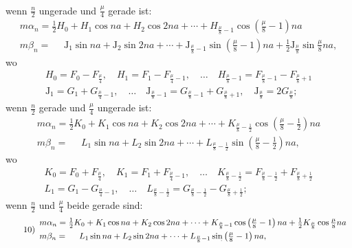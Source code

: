 \begin{landscape}
\[\begin{gathered}
\end{gathered}
\]
wenn \(\frac{n}{2}\) ungerade und \(\frac{\mu}{4}\) gerade ist:
\[
\tag*{8)}
\begin{array}{l}
m\alpha_n = \tfrac{1}{2}H_0 + H_1\cos na + H_2\cos 2na + \cdots + H_{\frac{\mu}{8}-1}\cos\left(\frac{\mu}{8}-1\right)na \\[4pt]
m\beta_n = \phantom{{}={}} \mathrm{J}_1\sin na + \mathrm{J}_2\sin 2na + \cdots + \mathrm{J}_{\frac{\mu}{8}-1}\sin\left(\frac{\mu}{8}-1\right)na + \tfrac{1}{2}\mathrm{J}_{\frac{\mu}{8}}\sin\frac{\mu}{8}na,
\end{array}
\]
wo
\[
\begin{gathered}
H_0 = F_0 - F_{\frac{\mu}{4}}, \quad H_1 = F_1 - F_{\frac{\mu}{4}-1}, \quad \ldots \quad H_{\frac{\mu}{8}-1} = F_{\frac{\mu}{8}-1} - F_{\frac{\mu}{8}+1}\\[4pt]
\mathrm{J}_1 = G_1 + G_{\frac{\mu}{4}-1}, \quad \ldots \quad \mathrm{J}_{\frac{\mu}{8}-1} = G_{\frac{\mu}{8}-1} + G_{\frac{\mu}{8}+1}, \quad \mathrm{J}_{\frac{\mu}{8}} = 2G_{\frac{\mu}{8}};
\end{gathered}
\]
wenn \(\frac{n}{2}\) gerade und \(\frac{\mu}{4}\) ungerade ist:
\[
\tag*{9)}
\begin{array}{l}
m\alpha_n = \tfrac{1}{2}K_0 + K_1\cos na + K_2\cos 2na + \cdots + K_{\frac{\mu}{8}-\frac{1}{2}}\cos\left(\frac{\mu}{8}-\frac{1}{2}\right)na \\[4pt]
m\beta_n = \phantom{{}={}} L_1\sin na + L_2\sin 2na + \cdots + L_{\frac{\mu}{8}-\frac{1}{2}}\sin\left(\frac{\mu}{8}-\frac{1}{2}\right)na,
\end{array}
\]
wo
\[
\begin{gathered}
K_0 = F_0 + F_{\frac{\mu}{4}}, \quad K_1 = F_1 + F_{\frac{\mu}{4}-1}, \quad \ldots \quad K_{\frac{\mu}{8}-\frac{1}{2}} = F_{\frac{\mu}{8}-\frac{1}{2}} + F_{\frac{\mu}{8}+\frac{1}{2}}\\[4pt]
L_1 = G_1 - G_{\frac{\mu}{4}-1}, \quad \ldots \quad L_{\frac{\mu}{8}-\frac{1}{2}} = G_{\frac{\mu}{8}-\frac{1}{2}} - G_{\frac{\mu}{8}+\frac{1}{2}};
\end{gathered}
\]
wenn \(\frac{n}{2}\) und \(\frac{\mu}{4}\) beide gerade sind:
\[
\tag*{10)}
\begin{array}{l}
m\alpha_n = \tfrac{1}{2}K_0 + K_1\cos na + K_2\cos 2na + \cdots + K_{\frac{\mu}{8}-1}\cos\left(\frac{\mu}{8}-1\right)na + \tfrac{1}{2}K_{\frac{\mu}{8}}\cos\frac{\mu}{8}na \\[4pt]
m\beta_n = \phantom{{}={}} L_1\sin na + L_2\sin 2na + \cdots + L_{\frac{\mu}{8}-1}\VtwoMarkedSin\left(\frac{\mu}{8}-1\right)na,

\end{array}\]
\end{landscape}
